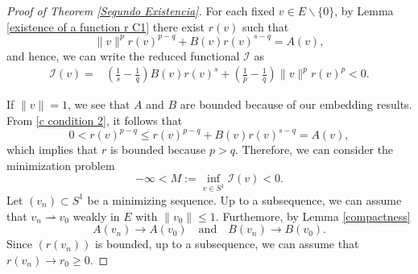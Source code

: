 \documentclass[12pt,reqno]{amsart}
\begin{document}
\begin{proof}[Proof of Theorem \ref{Segundo Existencia}] For each fixed  $v \in E\backslash\{0\}$, by Lemma \ref{existence of a function r C1} there exist $r(v)$ such that 
 \begin{equation}\label{c condition 2} 
     \|v\|^pr(v)^{p-q}+B(v)r(v)^{s-q}=A(v),
 \end{equation}
and hence, we can write the reduced functional $\mathcal{I}$ as
	\begin{align*}
		\mathcal{I}(v)=& \left(\frac{1}{s}-\frac{1}{q}\right)B(v)r(v)^s+\left(\frac{1}{p}-\frac{1}{q}\right)\|v\|^pr(v)^p<0.
	\end{align*}
 
If $\|v\|=1$, we see that $A$ and $B$ are bounded because of our embedding results. From  \eqref{c condition 2}, it follows that
\begin{equation*}
    0<r(v)^{p-q}\leq r(v)^{p-q}+B(v)r(v)^{s-q}=A(v),
\end{equation*}
which implies that $r$ is bounded because $p>q$. Therefore, we can consider the minimization problem
	$$
		-\infty<M:=\inf_{v \in S^1}\mathcal{I}(v)<0.  
	$$
	 Let $(v_n) \subset S^1$ be a minimizing sequence. Up to a subsequence, we can assume that $v_n \rightharpoonup v_0$ weakly in $E$ with $\|v_0\|\leq1$. 
	Furthemore, by Lemma \ref{compactness} 
	\begin{equation*}
		A(v_n)\rightarrow A(v_0)\quad\text{and}\quad B(v_n)\rightarrow B(v_0).
	\end{equation*}
 Since $(r(v_n))$ is bounded, up to a subsequence, we can assume that $r(v_n)\rightarrow r_0\geq 0$. 

 
 

\end{proof}
\end{document}
